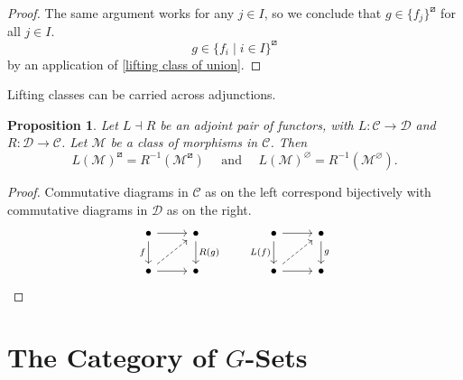 \documentclass{amsart}
\renewcommand\emptyset\varnothing
\newcommand{\cat}{\mathcal}
\newcommand{\catC}{\mathcal{C}}
\newcommand{\catD}{\mathcal{D}}
\newcommand{\rlp}[1]{{#1}^{\boxslash}}
\numberwithin{equation}{section}
\newtheorem{proposition}[equation]{Proposition}
\theoremstyle{definition}
\begin{document}
\begin{proof}
	The same argument works for any $j \in I$, so we conclude that $g \in \rlp{\{f_j\}}$ for all $j \in I$.
	\[
		g \in \{f_i \mid i \in I\}^\boxslash
	\]
	by an application of \cref{lifting class of union}.
\end{proof}

Lifting classes can be carried across adjunctions.

\begin{proposition}\label{proposition:adjunction boxslash}
	Let $L \dashv R$ be an adjoint pair of functors, with $L : \catC \to \catD$ and $R : \catD \to \catC$. Let $\mathcal{M}$ be a class of morphisms in $\catC$. Then
	\[
		\rlp{L(\mathcal{M})} = R^{-1}(\rlp{\mathcal{M}})
		\quad \text{ and } \quad
		L(\mathcal{M})^\emptyset = R^{-1}(\mathcal{M}^\emptyset).
	\]
\end{proposition}

\begin{proof}
	Commutative diagrams
	in $\catC$ as on the left correspond bijectively with commutative diagrams in $\cat D$ as on the right.
	\[
		\begin{tikzcd}[ampersand replacement=\&]
			\bullet \& \bullet \\
			\bullet \& \bullet
			\arrow[from=1-1, to=1-2]
			\arrow["f"', from=1-1, to=2-1]
			\arrow["{R(g)}", from=1-2, to=2-2]
			\arrow[dashed, from=2-1, to=1-2]
			\arrow[from=2-1, to=2-2]
		\end{tikzcd}
		\qquad
		\begin{tikzcd}[ampersand replacement=\&]
			\bullet \& \bullet \\
			\bullet \& \bullet
			\arrow[from=1-1, to=1-2]
			\arrow["{L(f)}"', from=1-1, to=2-1]
			\arrow["g", from=1-2, to=2-2]
			\arrow[dashed, from=2-1, to=1-2]
			\arrow[from=2-1, to=2-2]
		\end{tikzcd}\qedhere
	\]
\end{proof}

\section{The Category of \texorpdfstring{$G$}{G}-Sets}
\end{document}
